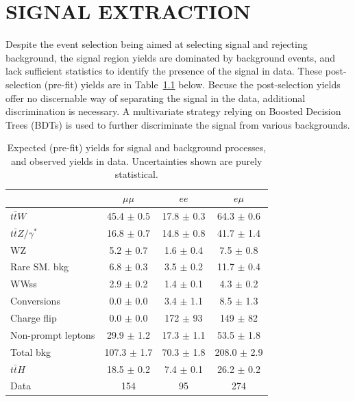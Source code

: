 %
%

\chapter{SIGNAL EXTRACTION}
Despite the event selection being aimed at selecting signal and rejecting background, the signal region yields are dominated by background events,
and lack sufficient statistics to identify the presence of the \tth signal in data. These post-selection (pre-fit) yields are in Table~\ref{tab:yields} below.
Becuse the post-selection yields offer no discernable way of separating the signal in the data, additional discrimination is necessary. A multivariate strategy
relying on Boosted Decision Trees (BDTs) is used to further discriminate the \tth signal from various backgrounds. 

\begin{table}[htbp]
\begin{center}
  \caption[Signal region event yields by lepton flavor]{Expected (pre-fit) yields for signal and background processes, and observed yields in data. Uncertainties shown
are purely statistical.}
    \begin{tabular}{l c c c} \hline
& $\mu\mu$ & $ee$ & $e\mu$  \\ \hline 
$t\bar{t}W$ & 45.4 $\pm$ 0.5 & 17.8 $\pm$ 0.3 & 64.3 $\pm$ 0.6 \\
$t\bar{t}Z/\gamma^{*}$ & 16.8 $\pm$ 0.7 & 14.8 $\pm$ 0.8 & 41.7 $\pm$ 1.4 \\
\hline
WZ & 5.2 $\pm$ 0.7 & 1.6 $\pm$ 0.4 & 7.5 $\pm$ 0.8 \\
Rare SM. bkg & 6.8 $\pm$ 0.3 & 3.5 $\pm$ 0.2 & 11.7 $\pm$ 0.4 \\
WWss & 2.9 $\pm$ 0.2 & 1.4 $\pm$ 0.1 & 4.3 $\pm$ 0.2 \\
\hline
Conversions & 0.0 $\pm$ 0.0 & 3.4 $\pm$ 1.1 & 8.5 $\pm$ 1.3 \\
Charge flip & 0.0 $\pm$ 0.0 & 172 $\pm$ 93 & 149 $\pm$ 82 \\
Non-prompt leptons & 29.9 $\pm$ 1.2 & 17.3 $\pm$ 1.1 & 53.5 $\pm$ 1.8 \\
\hline
Total bkg & 107.3 $\pm$ 1.7 & 70.3 $\pm$ 1.8 & 208.0 $\pm$ 2.9 \\
 \hline
$t\bar{t}H$ & 18.5 $\pm$ 0.2 & 7.4 $\pm$ 0.1 & 26.2 $\pm$ 0.2 \\
 \hline
Data & 154 & 95 & 274 \\
\hline
\end{tabular}
    \label{tab:yields}
\end{center}
\end{table}


